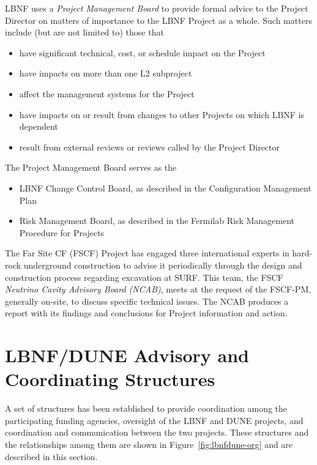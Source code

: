 LBNF uses a \textit{Project Management Board} to provide formal advice to the Project Director on matters of importance to the LBNF Project as a whole. Such matters include (but are not limited to) those that
\begin{itemize}
\item have significant technical, cost, or schedule impact on the Project
\item have impacts on more than one L2 subproject
\item affect the management systems for the Project
\item have impacts on or result from changes to other Projects on which LBNF is dependent
\item result from external reviews or reviews called by the Project Director
\end{itemize}

The Project Management Board serves as the
\begin{itemize}
\item LBNF Change Control Board, as described in the Configuration Management Plan\cite{CMP-82} 
\item Risk Management Board, as described in the Fermilab Risk Management Procedure for Projects~\cite{fnal-risk-mgmt} %
\end{itemize}

The Far Site CF (FSCF) Project has engaged three international experts in hard-rock underground construction to advise it periodically through the design and construction process regarding excavation at SURF. This team, the FSCF \textit{Neutrino Cavity Advisory Board (NCAB)}, %
meets at the request of the FSCF-PM, generally on-site, to discuss specific technical issues. The NCAB produces a report with its findings and conclusions for Project information and action. 

\section{LBNF/DUNE Advisory and Coordinating Structures}
\label{sec:lbnf-dune-interface}

A set of structures has been established to provide coordination among the participating funding agencies, oversight of the LBNF and DUNE projects, and coordination and communication between the two projects.  These structures and the relationships among them are shown in Figure~\ref{fig:lbnfdune-org} and are described in this section.

